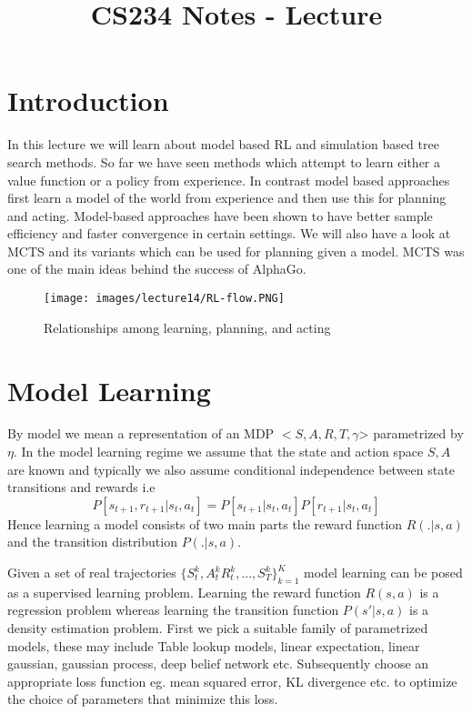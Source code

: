 \documentclass{article}
\title{CS234 Notes - Lecture \lecturenum \\ \lecturetitle }
\author{ \lecturescribe }
\begin{document}
\maketitle

\section{Introduction}
In this lecture we will learn about model based RL and simulation based tree search methods. So far we have seen methods which attempt to learn either a value function or a policy from experience. In contrast model based approaches first learn a model of the world from experience and then use this for planning and acting. Model-based approaches have been shown to have better sample efficiency and faster convergence in certain settings.
We will also have a look at MCTS and its variants which can be used for planning given a model. MCTS was one of the main ideas behind the success of AlphaGo.\\
\begin{figure}[H]
\centering
\texttt{[image: images/lecture14/RL-flow.PNG]}
\caption{Relationships among learning, planning, and acting}
\end{figure}

\section{Model Learning}
By model we mean a representation of an MDP $<S,A,R,T,\gamma$> parametrized by $\eta$. In the model learning regime we assume that the state and action space $S,A$ are known and typically we also assume conditional independence between state transitions and rewards i.e $$P[s_{t+1},r_{t+1}|s_t,a_t]=P[s_{t+1}|s_t,a_t]P[r_{t+1}|s_t,a_t]$$
Hence learning a model consists of two main parts the reward function $R(.|s,a)$ and the transition distribution $P(.|s,a)$. \par 
Given a set of real trajectories $\{S_t^k,A_t^kR_t^k,...,S_T^k\}^K_{k=1}$ model learning can be posed as a supervised learning problem.
Learning the reward function $R(s,a)$ is a regression problem whereas learning the transition function $P(s'|s,a)$ is a density estimation problem. First we pick a suitable family of parametrized models, these may include Table lookup models, linear expectation, linear gaussian, gaussian process, deep belief network etc.  
Subsequently choose an appropriate loss function eg. mean squared error, KL divergence etc. to optimize the choice of parameters that minimize this loss. 
\end{document}
